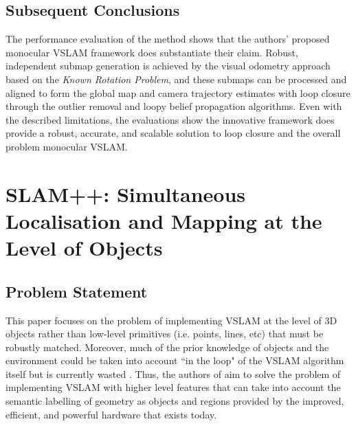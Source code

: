 \documentclass[10pt,twocolumn,letterpaper]{article}
\begin{document}
\subsection{Subsequent Conclusions}
The performance evaluation of the method shows that the authors' proposed monocular VSLAM framework does
 substantiate their claim. Robust, independent submap generation is achieved by the visual odometry approach 
based on the \textit{Known Rotation Problem}, and these submaps can be processed and aligned to form the 
global map and camera trajectory estimates with loop closure through the outlier removal and loopy belief 
propagation algorithms. Even with the described limitations, the evaluations show the innovative framework does 
provide a robust, accurate, and scalable solution to loop closure and the overall problem monocular VSLAM.

\section {SLAM++: Simultaneous Localisation and Mapping at the Level of Objects}
\subsection{Problem Statement}
This paper focuses on the problem of implementing VSLAM at the level of 3D objects rather than low-level 
primitives (i.e. points, lines, etc) that must be robustly matched. Moreover, much of the prior knowledge of
 objects and the environment could be taken into account ``in the loop" of the VSLAM algorithm itself but is 
 currently wasted \cite{Salas-Moreno_2013_CVPR}. Thus, the authors of \cite{Salas-Moreno_2013_CVPR} 
 aim to solve the problem of implementing VSLAM with higher level features that can take into account the semantic labelling of geometry as objects and regions provided by the improved, efficient, and powerful hardware that exists today.

\end{document}
